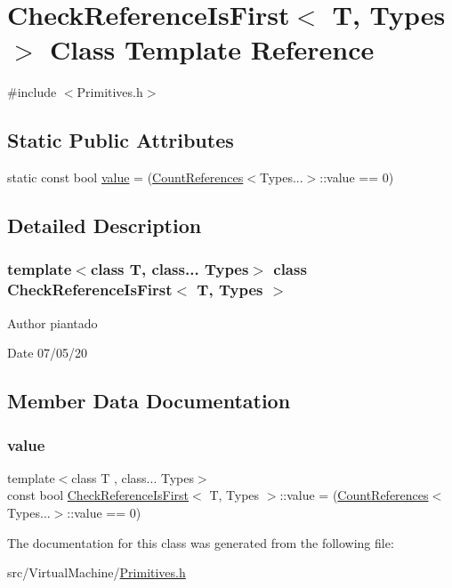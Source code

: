 \hypertarget{struct_check_reference_is_first}{}\section{Check\+Reference\+Is\+First$<$ T, Types $>$ Class Template Reference}
\label{struct_check_reference_is_first}


{\ttfamily \#include $<$Primitives.\+h$>$}

\subsection*{Static Public Attributes}
\begin{DoxyCompactItemize}
\item 
static const bool \hyperlink{struct_check_reference_is_first_a0b4db809c2e3980d79ba182e7da8d50f}{value} = (\hyperlink{struct_count_references}{Count\+References}$<$Types...$>$\+::value == 0)
\end{DoxyCompactItemize}


\subsection{Detailed Description}
\subsubsection*{template$<$class T, class... Types$>$\newline
class Check\+Reference\+Is\+First$<$ T, Types $>$}

\begin{DoxyAuthor}{Author}
piantado 
\end{DoxyAuthor}
\begin{DoxyDate}{Date}
07/05/20 
\end{DoxyDate}


\subsection{Member Data Documentation}
\mbox{\label{struct_check_reference_is_first_a0b4db809c2e3980d79ba182e7da8d50f}} 
\subsubsection{\texorpdfstring{value}{value}}
{\footnotesize\ttfamily template$<$class T , class... Types$>$ \\
const bool \hyperlink{struct_check_reference_is_first}{Check\+Reference\+Is\+First}$<$ T, Types $>$\+::value = (\hyperlink{struct_count_references}{Count\+References}$<$Types...$>$\+::value == 0)\hspace{0.3cm}{\ttfamily [static]}}



The documentation for this class was generated from the following file\+:\begin{DoxyCompactItemize}
\item 
src/\+Virtual\+Machine/\hyperlink{_primitives_8h}{Primitives.\+h}\end{DoxyCompactItemize}

